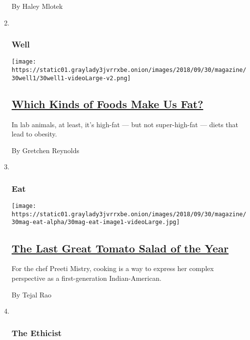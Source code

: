 \begin{enumerate}
  By Haley Mlotek
\item ~
  \hypertarget{well}{%
  \subsubsection{Well}\label{well}}

  \texttt{[image: https://static01.graylady3jvrrxbe.onion/images/2018/09/30/magazine/30well1/30well1-videoLarge-v2.png]}

  \hypertarget{which-kinds-of-foods-make-us-fat}{%
  \subsection{\texorpdfstring{\href{/2018/09/25/well/eat/which-kinds-of-foods-make-us-fat.html}{Which
  Kinds of Foods Make Us
  Fat?}}{Which Kinds of Foods Make Us Fat?}}\label{which-kinds-of-foods-make-us-fat}}

  In lab animals, at least, it's high-fat --- but not super-high-fat ---
  diets that lead to obesity.

  By Gretchen Reynolds
\item ~
  \hypertarget{eat}{%
  \subsubsection{Eat}\label{eat}}

  \texttt{[image: https://static01.graylady3jvrrxbe.onion/images/2018/09/30/magazine/30mag-eat-alpha/30mag-eat-image1-videoLarge.jpg]}

  \hypertarget{the-last-great-tomato-salad-of-the-year}{%
  \subsection{\texorpdfstring{\href{/2018/09/26/magazine/the-last-great-tomato-salad-of-the-year.html}{The
  Last Great Tomato Salad of the
  Year}}{The Last Great Tomato Salad of the Year}}\label{the-last-great-tomato-salad-of-the-year}}

  For the chef Preeti Mistry, cooking is a way to express her complex
  perspective as a first-generation Indian-American.

  By Tejal Rao
\item ~
  \hypertarget{the-ethicist}{%
  \subsubsection{The Ethicist}\label{the-ethicist}}


\end{enumerate}
